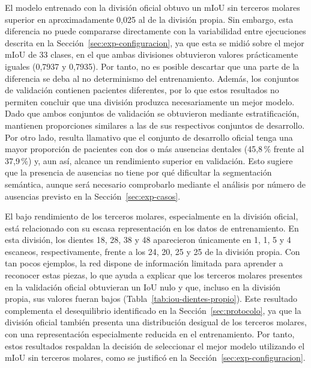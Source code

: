 El modelo entrenado con la división oficial obtuvo un mIoU sin terceros molares superior en aproximadamente 0{,}025 al de la división propia. Sin embargo, esta diferencia no puede compararse directamente con la variabilidad entre ejecuciones descrita en la Sección~\ref{sec:exp-configuracion}, ya que esta se midió sobre el mejor mIoU de 33 clases, en el que ambas divisiones obtuvieron valores prácticamente iguales (0{,}7937 y 0{,}7935). Por tanto, no es posible descartar que una parte de la diferencia se deba al no determinismo del entrenamiento. Además, los conjuntos de validación contienen pacientes diferentes, por lo que estos resultados no permiten concluir que una división produzca necesariamente un mejor modelo. Dado que ambos conjuntos de validación se obtuvieron mediante estratificación, mantienen proporciones similares a las de sus respectivos conjuntos de desarrollo. Por otro lado, resulta llamativo que el conjunto de desarrollo oficial tenga una mayor proporción de pacientes con dos o más ausencias dentales (45{,}8\,\% frente al 37{,}9\,\%) y, aun así, alcance un rendimiento superior en validación. Esto sugiere que la presencia de ausencias no tiene por qué dificultar la segmentación semántica, aunque será necesario comprobarlo mediante el análisis por número de ausencias previsto en la Sección~\ref{sec:exp-casos}.

El bajo rendimiento de los terceros molares, especialmente en la división oficial, está relacionado con su escasa representación en los datos de entrenamiento. En esta división, los dientes 18, 28, 38 y 48 aparecieron únicamente en 1, 1, 5 y 4 escaneos, respectivamente, frente a los 24, 20, 25 y 25 de la división propia. Con tan pocos ejemplos, la red dispone de información limitada para aprender a reconocer estas piezas, lo que ayuda a explicar que los terceros molares presentes en la validación oficial obtuvieran un IoU nulo y que, incluso en la división propia, sus valores fueran bajos (Tabla~\ref{tab:iou-dientes-propio}). Este resultado complementa el desequilibrio identificado en la Sección~\ref{sec:protocolo}, ya que la división oficial también presenta una distribución desigual de los terceros molares, con una representación especialmente reducida en el entrenamiento. Por tanto, estos resultados respaldan la decisión de seleccionar el mejor modelo utilizando el mIoU sin terceros molares, como se justificó en la Sección~\ref{sec:exp-configuracion}.

